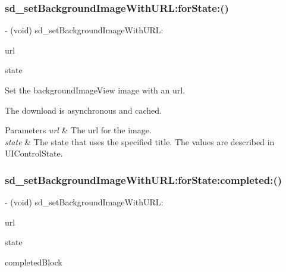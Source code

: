 \subsubsection{\texorpdfstring{sd\+\_\+set\+Background\+Image\+With\+U\+R\+L\+:for\+State\+:()}{sd\_setBackgroundImageWithURL:forState:()}\hspace{0.1cm}{\footnotesize\ttfamily [3/3]}}
{\footnotesize\ttfamily -\/ (void) sd\+\_\+set\+Background\+Image\+With\+U\+R\+L\+: \begin{DoxyParamCaption}\item[{(N\+S\+U\+RL $\ast$)}]{url }\item[{forState:(U\+I\+Control\+State)}]{state }\end{DoxyParamCaption}}

Set the background\+Image\+View {\ttfamily image} with an {\ttfamily url}.

The download is asynchronous and cached.


\begin{DoxyParams}{Parameters}
{\em url} & The url for the image. \\
\hline
{\em state} & The state that uses the specified title. The values are described in U\+I\+Control\+State. \\
\hline
\end{DoxyParams}
\mbox{\label{category_u_i_button_07_web_cache_08_a1c472e78e9d0fbbd9bd54b06a83813f9}} 
\subsubsection{\texorpdfstring{sd\+\_\+set\+Background\+Image\+With\+U\+R\+L\+:for\+State\+:completed\+:()}{sd\_setBackgroundImageWithURL:forState:completed:()}\hspace{0.1cm}{\footnotesize\ttfamily [1/3]}}
{\footnotesize\ttfamily -\/ (void) sd\+\_\+set\+Background\+Image\+With\+U\+R\+L\+: \begin{DoxyParamCaption}\item[{(N\+S\+U\+RL $\ast$)}]{url }\item[{forState:(U\+I\+Control\+State)}]{state }\item[{completed:(S\+D\+Web\+Image\+Completion\+Block)}]{completed\+Block }\end{DoxyParamCaption}}

